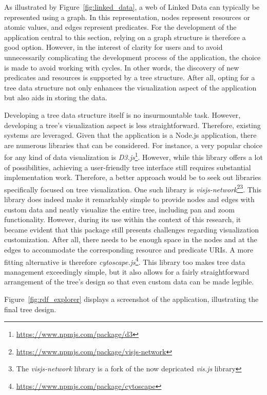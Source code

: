 As illustrated by Figure~\ref{fig:linked_data}, a web of Linked Data can typically be represented using a graph. In this representation, nodes represent resources or atomic values, and edges represent predicates. For the development of the application central to this section, relying on a graph structure is therefore a good option. However, in the interest of clarity for users and to avoid unnecessarily complicating the development process of the application, the choice is made to avoid working with cycles. In other words, the discovery of new predicates and resources is supported by a tree structure. After all, opting for a tree data structure not only enhances the visualization aspect of the application but also aids in storing the data.

Developing a tree data structure itself is no insurmountable task. However, developing a tree's visualization aspect is less straightforward. Therefore, existing systems are leveraged. Given that the application is a Node.js application, there are numerous libraries that can be considered. For instance, a very popular choice for any kind of data visualization is \textit{D3.js}\footnote{\url{https://www.npmjs.com/package/d3}}. However, while this library offers a lot of possibilities, achieving a user-friendly tree interface still requires substantial implementation work. Therefore, a better approach would be to seek out libraries specifically focused on tree visualization. One such library is \textit{visjs-network}\footnote{\url{https://www.npmjs.com/package/visjs-network}}\footnote{The \textit{visjs-network} library is a fork of the now depricated \textit{vis.js} library}. This library does indeed make it remarkably simple to provide nodes and edges with custom data and neatly visualize the entire tree, including pan and zoom functionality. However, during its use within the context of this research, it became evident that this package still presents challenges regarding visualization customization. After all, there needs to be enough space in the nodes and at the edges to accommodate the corresponding resource and predicate URIs. A more fitting alternative is therefore \textit{cytoscape.js}\footnote{\url{https://www.npmjs.com/package/cytoscape}}. This library too makes tree data management exceedingly simple, but it also allows for a fairly straightforward arrangement of the tree's design so that even custom data can be made legible.

Figure~\ref{fig:rdf_explorer} displays a screenshot of the application, illustrating the final tree design.

